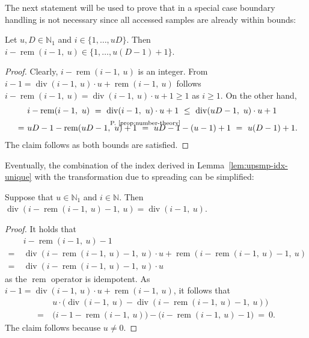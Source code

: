 \documentclass[journal]{IEEEtran}
\newcommand{\N}{\mathbb{N}}
\newcommand{\discint}[2]{\{#1,\dotsc,#2\}}
\newcommand{\inint}[2]{\in\discint{#1}{#2}}
\renewcommand{\div}[2]{\operatorname{div}(#1,\ #2)}
\newcommand{\rem}[2]{\operatorname{rem}(#1,\ #2)}
\newcommand{\equsing}[1]{\overset{\mathclap{\text{#1}}}{=}}
\begin{document}
The next statement will be used to prove that in a special case boundary handling is not necessary since all accessed samples are already within bounds:
\begin{lemma}
\label{lem:upsmp-no-boundhand}
Let $u,D\in\N_1$ and $i\inint{1}{uD}$. Then $i - \rem{i - 1}{u} \inint{1}{u(D - 1) + 1}$.
\end{lemma}\begin{proof}
Clearly, $i - \rem{i - 1}{u}$ is an integer.
From $i - 1 = \div{i - 1}{u}\cdot u + \rem{i - 1}{u}$ follows $i - \rem{i - 1}{u} = \div{i - 1}{u}\cdot u + 1 \geq 1$ as $i \geq 1$.
On the other hand,
\begin{align*}
  & i - \rem{i - 1}{u}
  \ =\ \div{i - 1}{u}\cdot u + 1
  \ \leq\ \div{uD - 1}{u}\cdot u + 1\\
  \ =\ &uD - 1 - \rem{uD - 1}{u} + 1
  \ \equsing{P.~\ref{prop:number-theory}}\ uD - 1 - (u - 1) + 1
  \ =\ u(D - 1) + 1\text{.}
\end{align*}
The claim follows as both bounds are satisfied.
\end{proof}

Eventually, the combination of the index derived in Lemma~\ref{lem:upsmp-idx-unique} with the transformation due to spreading can be simplified:
\begin{lemma}
\label{lem:upsmp-idx-simplify}
Suppose that $u\in\N_1$ and $i\in\N$.
Then $\div{i - \rem{i - 1}{u} - 1}{u} = \div{i - 1}{u}$.
\end{lemma}\begin{proof}
It holds that
\begin{align*}
  & i - \rem{i - 1}{u} - 1\\
  =\ & \div{i - \rem{i - 1}{u} - 1}{u}\cdot u + \rem{i - \rem{i - 1}{u} - 1}{u}\\
  =\ & \div{i - \rem{i - 1}{u} - 1}{u}\cdot u
\end{align*}
as the $\operatorname{rem}$ operator is idempotent.
As $i - 1 = \div{i - 1}{u}\cdot u + \rem{i - 1}{u}$, it follows that
\begin{align*}
  & u\cdot\big( \div{i - 1}{u} - \div{i - \rem{i - 1}{u} - 1}{u} \big)\\
  =\ & \big(i - 1 - \rem{i - 1}{u}\big) - \big( i - \rem{i - 1}{u} - 1 \big)
  \ =\ 0\text{.}
\end{align*}
The claim follows because $u\neq 0$.
\end{proof}
\end{document}
